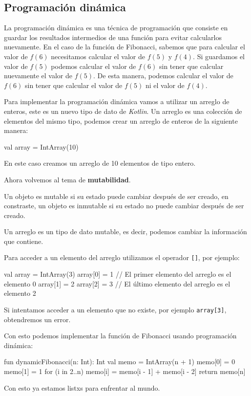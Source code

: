 \subsection{Programación dinámica}
  La programación dinámica es una técnica de programación que consiste en guardar los resultados
  intermedios de una función para evitar calcularlos nuevamente.
  En el caso de la función de Fibonacci, sabemos que para
  calcular el valor de \(f(6)\) necesitamos calcular el valor de \(f(5)\) y \(f(4)\).
  Si guardamos el valor de \(f(5)\) podemos calcular el valor de \(f(6)\) sin tener que
  calcular nuevamente el valor de \(f(5)\).
  De esta manera, podemos calcular el valor de \(f(6)\) sin tener que calcular el valor de
  \(f(5)\) ni el valor de \(f(4)\).
  
  Para implementar la programación dinámica vamos a utilizar un arreglo de enteros, este es un nuevo
  tipo de dato de \textit{Kotlin}.
  Un arreglo es una colección de elementos del mismo tipo, podemos crear un arreglo de enteros de la
  siguiente manera:
  
  \begin{kotlin}
    val array = IntArray(10)
  \end{kotlin}

  En este caso creamos un arreglo de 10 elementos de tipo entero.

  Ahora volvemos al tema de \textbf{mutabilidad}.

  \begin{defaultbox}[Mutabilidad]
    Un objeto es mutable si su estado puede cambiar después de ser creado, en constraste, un objeto 
    es inmutable si su estado no puede cambiar después de ser creado.
  \end{defaultbox}

  Un arreglo es un tipo de dato mutable, es decir, podemos cambiar la información que contiene.

  Para acceder a un elemento del arreglo utilizamos el operador \texttt{[]}, por ejemplo:

  \begin{kotlin}
    val array = IntArray(3)
    array[0] = 1  // El primer elemento del arreglo es el elemento 0
    array[1] = 2
    array[2] = 3  // El último elemento del arreglo es el elemento 2
  \end{kotlin}

  Si intentamos acceder a un elemento que no existe, por ejemplo \texttt{array[3]}, obtendremos un
  error.

  Con esto podemos implementar la función de Fibonacci usando programación dinámica:

  \begin{kotlin}
    fun dynamicFibonacci(n: Int): Int {
      val memo = IntArray(n + 1)
      memo[0] = 0
      memo[1] = 1
      for (i in 2..n) {
        memo[i] = memo[i - 1] + memo[i - 2]
      }
      return memo[n]
    }
  \end{kotlin}

  Con esto ya estamos listxs para enfrentar al mundo.
